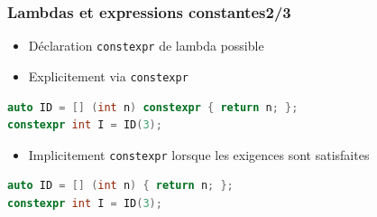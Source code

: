 \documentclass[C++.tex]{subfiles}
\begin{document}
\begin{frame}[fragile]
	\frametitle{Lambdas et expressions constantes\titlehfill{}2/3}
	\begin{itemize}
		\item Déclaration \lstinline|constexpr| de lambda possible 
		\item Explicitement via \lstinline|constexpr|
	\end{itemize}

	\begin{lstlisting}[language=C++]
auto ID = [] (int n) constexpr { return n; };
constexpr int I = ID(3);\end{lstlisting}

	\begin{itemize}
		\item Implicitement \lstinline|constexpr| lorsque les exigences sont satisfaites
	\end{itemize}


	\begin{lstlisting}[language=C++]
auto ID = [] (int n) { return n; };
constexpr int I = ID(3);\end{lstlisting}
\end{frame}
\end{document}
